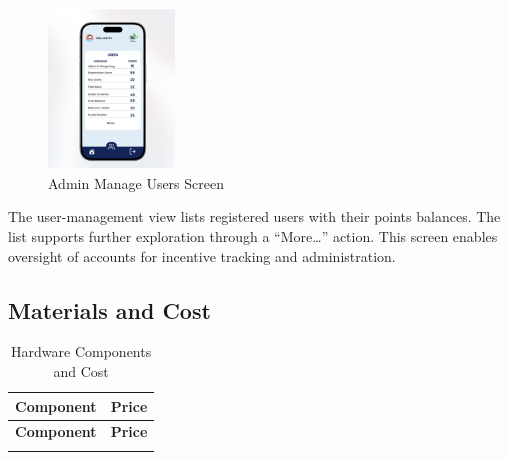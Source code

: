 {      \begin{figure}[H]
      	\centering
      	\caption{Admin Manage Users Screen}
      	\label{fig:admin2}
      	\includegraphics[width=0.3\textwidth]{figures/admin2.png}
      \end{figure}
      
      The user-management view lists registered users with their points balances. The list supports further exploration through a “More…” action. This screen enables oversight of accounts for incentive tracking and administration.
      
      
 \subsection{Materials and Cost}
     
     \begin{longtable}{p{6cm} p{4cm}}
     	\caption{Hardware Components and Cost} \label{tab:MaterialsAndCost} \\
     	\toprule
     	\textbf{Component} & \textbf{Price} \\ 
     	\midrule
     	\endfirsthead
     	
     	\toprule
     	\textbf{Component} & \textbf{Price} \\ 
     	\midrule
     	\endhead
     	
     	\bottomrule
     	\endfoot
     	

\end{longtable}}
